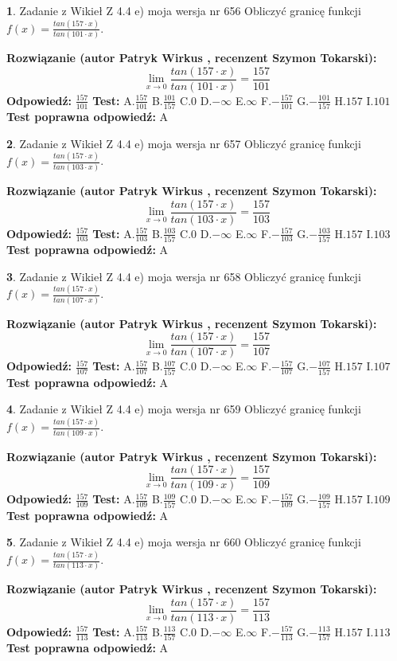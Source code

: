 \documentclass[12pt, a4paper]{article}
\theoremstyle{definition} %
\newtheorem{zad}{}
\newcommand{\zadStart}[1]{\begin{zad}#1\newline}
\newcommand{\zadStop}{\end{zad}}
\newcommand{\rozwStart}[2]{\noindent \textbf{Rozwiązanie (autor #1 , recenzent #2): }\newline}
\newcommand{\rozwStop}{\newline}
\newcommand{\odpStart}{\noindent \textbf{Odpowiedź:}\newline}
\newcommand{\odpStop}{\newline}
\newcommand{\testStart}{\noindent \textbf{Test:}\newline}
\newcommand{\testStop}{\newline}
\newcommand{\kluczStart}{\noindent \textbf{Test poprawna odpowiedź:}\newline}
\newcommand{\kluczStop}{\newline}
\begin{document}
\zadStart{Zadanie z Wikieł Z 4.4 e) moja wersja nr 656}
Obliczyć granicę funkcji $f(x)=\frac{tan(157\cdot x)}{tan(101\cdot x)}$.
\zadStop
\rozwStart{Patryk Wirkus}{Szymon Tokarski}
$$\lim\limits_{x\to 0}\frac{tan(157\cdot x)}{tan(101\cdot x)}=
\frac{157}{101}$$
\rozwStop
\odpStart
$\frac{157}{101}$
\odpStop
\testStart
A.$\frac{157}{101}$
B.$\frac{101}{157}$
C.$0$
D.$-\infty$
E.$\infty$
F.$-\frac{157}{101}$
G.$-\frac{101}{157}$
H.$157$
I.$101$
\testStop
\kluczStart
A
\kluczStop



\zadStart{Zadanie z Wikieł Z 4.4 e) moja wersja nr 657}
Obliczyć granicę funkcji $f(x)=\frac{tan(157\cdot x)}{tan(103\cdot x)}$.
\zadStop
\rozwStart{Patryk Wirkus}{Szymon Tokarski}
$$\lim\limits_{x\to 0}\frac{tan(157\cdot x)}{tan(103\cdot x)}=
\frac{157}{103}$$
\rozwStop
\odpStart
$\frac{157}{103}$
\odpStop
\testStart
A.$\frac{157}{103}$
B.$\frac{103}{157}$
C.$0$
D.$-\infty$
E.$\infty$
F.$-\frac{157}{103}$
G.$-\frac{103}{157}$
H.$157$
I.$103$
\testStop
\kluczStart
A
\kluczStop



\zadStart{Zadanie z Wikieł Z 4.4 e) moja wersja nr 658}
Obliczyć granicę funkcji $f(x)=\frac{tan(157\cdot x)}{tan(107\cdot x)}$.
\zadStop
\rozwStart{Patryk Wirkus}{Szymon Tokarski}
$$\lim\limits_{x\to 0}\frac{tan(157\cdot x)}{tan(107\cdot x)}=
\frac{157}{107}$$
\rozwStop
\odpStart
$\frac{157}{107}$
\odpStop
\testStart
A.$\frac{157}{107}$
B.$\frac{107}{157}$
C.$0$
D.$-\infty$
E.$\infty$
F.$-\frac{157}{107}$
G.$-\frac{107}{157}$
H.$157$
I.$107$
\testStop
\kluczStart
A
\kluczStop



\zadStart{Zadanie z Wikieł Z 4.4 e) moja wersja nr 659}
Obliczyć granicę funkcji $f(x)=\frac{tan(157\cdot x)}{tan(109\cdot x)}$.
\zadStop
\rozwStart{Patryk Wirkus}{Szymon Tokarski}
$$\lim\limits_{x\to 0}\frac{tan(157\cdot x)}{tan(109\cdot x)}=
\frac{157}{109}$$
\rozwStop
\odpStart
$\frac{157}{109}$
\odpStop
\testStart
A.$\frac{157}{109}$
B.$\frac{109}{157}$
C.$0$
D.$-\infty$
E.$\infty$
F.$-\frac{157}{109}$
G.$-\frac{109}{157}$
H.$157$
I.$109$
\testStop
\kluczStart
A
\kluczStop



\zadStart{Zadanie z Wikieł Z 4.4 e) moja wersja nr 660}
Obliczyć granicę funkcji $f(x)=\frac{tan(157\cdot x)}{tan(113\cdot x)}$.
\zadStop
\rozwStart{Patryk Wirkus}{Szymon Tokarski}
$$\lim\limits_{x\to 0}\frac{tan(157\cdot x)}{tan(113\cdot x)}=
\frac{157}{113}$$
\rozwStop
\odpStart
$\frac{157}{113}$
\odpStop
\testStart
A.$\frac{157}{113}$
B.$\frac{113}{157}$
C.$0$
D.$-\infty$
E.$\infty$
F.$-\frac{157}{113}$
G.$-\frac{113}{157}$
H.$157$
I.$113$
\testStop
\kluczStart
A
\kluczStop
\end{document}
